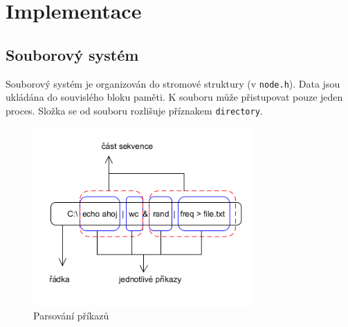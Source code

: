\documentclass[a4paper]{article}
\begin{document}

%


\section{Implementace}
\subsection{Souborový systém}
Souborový systém je organizován do stromové struktury (v \verb+node.h+). Data jsou ukládána do souvislého bloku paměti. K souboru může přistupovat pouze jeden proces. Složka se od souboru rozlišuje příznakem  \verb+directory+. 

\begin{figure}[h] 
\centering
 \includegraphics[width=0.75\textwidth]{./command.png}
\caption{Parsování příkazů}
\end{figure}
\end{document}
